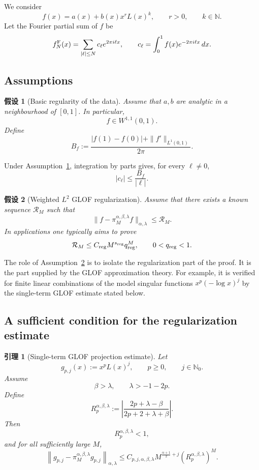 \documentclass[UTF8]{ctexart}
\newtheorem{assumption}{假设}
\newtheorem{lemma}{引理}
\begin{document}
We consider
\[
    f(x)=a(x)+b(x)x^rL(x)^k,
    \qquad r>0,\qquad k\in\mathbb N.
\]
Let the Fourier partial sum of $f$ be
\[
    f_N^{\rm F}(x)
    =
    \sum_{|\ell|\le N}c_\ell e^{2\pi i\ell x},
    \qquad
    c_\ell
    =
    \int_0^1 f(x)e^{-2\pi i\ell x}\,dx .
\]

\subsection{Assumptions}

\begin{assumption}[Basic regularity of the data]
\label{ass:data}
Assume that $a,b$ are analytic in a neighbourhood of $[0,1]$.
In particular,
\[
    f\in W^{1,1}(0,1).
\]
Define
\[
    B_f
    :=
    \frac{
    |f(1)-f(0)|+\|f'\|_{L^1(0,1)}
    }{2\pi}.
\]
\end{assumption}

Under Assumption~\ref{ass:data}, integration by parts gives, for every
$\ell\ne 0$,
\[
    |c_\ell|
    \le
    \frac{B_f}{|\ell|}.
\]

\begin{assumption}[Weighted $L^2$ GLOF regularization]
\label{ass:regularization}
Assume that there exists a known sequence $\mathcal R_M$ such that
\[
    \|f-\pi_M^{\alpha,\beta,\lambda}f\|_{\alpha,\lambda}
    \le
    \mathcal R_M.
\]
In applications one typically aims to prove
\[
    \mathcal R_M
    \le
    C_{\rm reg} M^{s_{\rm reg}}q_{\rm reg}^M,
    \qquad
    0<q_{\rm reg}<1.
\]
\end{assumption}

The role of Assumption~\ref{ass:regularization} is to isolate the
regularization part of the proof. It is the part supplied by the
GLOF approximation theory. For example, it is verified for finite
linear combinations of the model singular functions
$x^p(-\log x)^j$ by the single-term GLOF estimate stated below.

\subsection{A sufficient condition for the regularization estimate}

\begin{lemma}[Single-term GLOF projection estimate]
\label{lem:single-term}
Let
\[
    g_{p,j}(x):=x^pL(x)^j,
    \qquad p\ge 0,\qquad j\in\mathbb N_0.
\]
Assume
\[
    \beta>\lambda,
    \qquad
    \lambda>-1-2p.
\]
Define
\[
    R_p^{\alpha,\beta,\lambda}
    :=
    \left|
    \frac{2p+\lambda-\beta}
    {2p+2+\lambda+\beta}
    \right|.
\]
Then
\[
    R_p^{\alpha,\beta,\lambda}<1,
\]
and for all sufficiently large $M$,
\[
    \left\|
    g_{p,j}
    -
    \pi_M^{\alpha,\beta,\lambda}g_{p,j}
    \right\|_{\alpha,\lambda}
    \le
    C_{p,j,\alpha,\beta,\lambda}
    M^{\frac{\alpha+1}{2}+j}
    \left(R_p^{\alpha,\beta,\lambda}\right)^M .
\]
\end{lemma}
\end{document}
